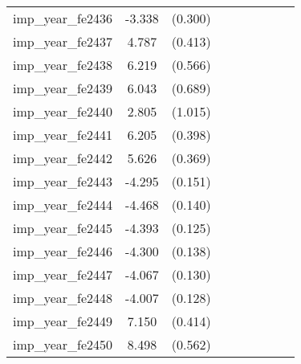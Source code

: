 {\begin{tabular}{l*{4}{cc}}
imp\_year\_fe2436&   -3.338\sym{***}&  (0.300)&                  &         &                  &         &                  &         \\
imp\_year\_fe2437&    4.787\sym{***}&  (0.413)&                  &         &                  &         &                  &         \\
imp\_year\_fe2438&    6.219\sym{***}&  (0.566)&                  &         &                  &         &                  &         \\
imp\_year\_fe2439&    6.043\sym{***}&  (0.689)&                  &         &                  &         &                  &         \\
imp\_year\_fe2440&    2.805\sym{**} &  (1.015)&                  &         &                  &         &                  &         \\
imp\_year\_fe2441&    6.205\sym{***}&  (0.398)&                  &         &                  &         &                  &         \\
imp\_year\_fe2442&    5.626\sym{***}&  (0.369)&                  &         &                  &         &                  &         \\
imp\_year\_fe2443&   -4.295\sym{***}&  (0.151)&                  &         &                  &         &                  &         \\
imp\_year\_fe2444&   -4.468\sym{***}&  (0.140)&                  &         &                  &         &                  &         \\
imp\_year\_fe2445&   -4.393\sym{***}&  (0.125)&                  &         &                  &         &                  &         \\
imp\_year\_fe2446&   -4.300\sym{***}&  (0.138)&                  &         &                  &         &                  &         \\
imp\_year\_fe2447&   -4.067\sym{***}&  (0.130)&                  &         &                  &         &                  &         \\
imp\_year\_fe2448&   -4.007\sym{***}&  (0.128)&                  &         &                  &         &                  &         \\
imp\_year\_fe2449&    7.150\sym{***}&  (0.414)&                  &         &                  &         &                  &         \\
imp\_year\_fe2450&    8.498\sym{***}&  (0.562)&                  &         &                  &         &                  &         \\

\end{tabular}}
